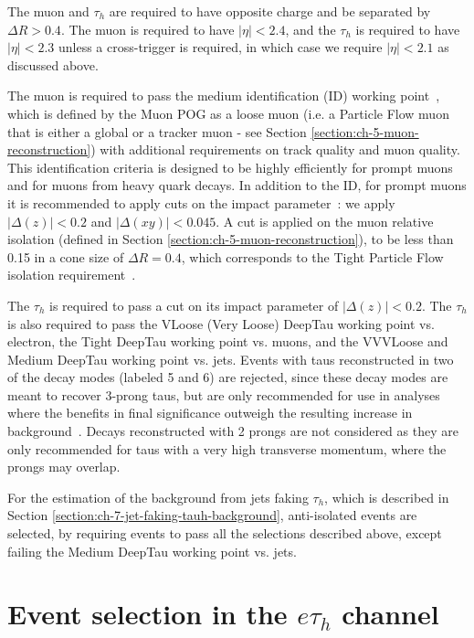 The muon and $\tau_h$ are required to have opposite charge and be separated by $\Delta R > 0.4$. The muon is required to have $|\eta| < 2.4$, and the $\tau_{h}$ is required to have $|\eta| < 2.3$ unless a cross-trigger is required, in which case we require $|\eta| < 2.1$ as discussed above.

The muon is required to pass the medium identification (ID) working point~\cite{twiki_MUON_POG_Run2_guide}, which is defined by the Muon POG as a loose muon (i.e. a Particle Flow muon that is either a global or a tracker muon - see Section \ref{section:ch-5-muon-reconstruction}) with additional requirements on track quality and muon quality. This identification criteria is designed to be highly efficiently for prompt muons and for muons from heavy quark decays. In addition to the ID, for prompt muons it is recommended to apply cuts on the impact parameter~\cite{twiki_MUON_POG_Run2_guide}: we apply $|\Delta(z)| < 0.2$ and $|\Delta(xy)| < 0.045$. A cut is applied on the muon relative isolation (defined in Section \ref{section:ch-5-muon-reconstruction}), to be less than 0.15 in a cone size of $\Delta R = 0.4$, which corresponds to the Tight Particle Flow isolation requirement~\cite{twiki_MUON_POG_Run2_guide}.

The $\tau_h$ is required to pass a cut on its impact parameter of $|\Delta(z)| < 0.2$. The $\tau_h$ is also required to pass the VLoose (Very Loose) DeepTau working point vs. electron, the Tight DeepTau working point vs. muons, and the VVVLoose and Medium DeepTau working point vs. jets. Events with taus reconstructed in two of the decay modes (labeled 5 and 6) are rejected, since these decay modes are meant to recover 3-prong taus, but are only recommended for use in analyses where the benefits in final significance outweigh the resulting increase in background~\cite{twiki_TAU_POG_tauidrecommendationforrun2}. Decays reconstructed with 2 prongs are not considered as they are only recommended for taus with a very high transverse momentum, where the prongs may overlap.

For the estimation of the background from jets faking $\tau_{h}$, which is described in Section \ref{section:ch-7-jet-faking-tauh-background}, anti-isolated events are selected, by requiring events to pass all the selections described above, except failing the Medium DeepTau working point vs. jets.

\section{Event selection in the \texorpdfstring{$e\tau_{h}$}{etauh} channel}
\label{section:ch-6-event-selection-etau}

